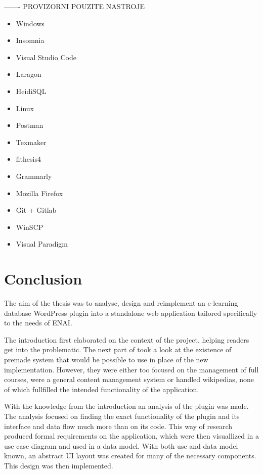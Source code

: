 \documentclass[
  digital,     %
  oneside,     %
  nosansbold,  %
  colorbold, %
  lof,         %
  lot,         %
]{fithesis4}
\begin{document}
\newpage

------- PROVIZORNI POUZITE NASTROJE

\begin{itemize}
	\item Windows
	\item Insomnia
	\item Visual Studio Code
	\item Laragon
	\item HeidiSQL
	\item Linux
	\item Postman
	\item Texmaker
	\item fithesis4
	\item Grammarly
	\item Mozilla Firefox
	\item Git + Gitlab
	\item WinSCP
	\item Visual Paradigm
\end{itemize}

\newpage

\chapter{Conclusion}

The aim of the thesis was to analyse, design and reimplement an e-learning database WordPress plugin into a standalone web application tailored specifically to the needs of ENAI.

The introduction first elaborated on the context of the project, helping readers get into the problematic.  The next part of took a look at the existence of premade system that would be possible to use in place of the new implementation. However, they were either too focused on the management of full courses, were a general content management system or handled wikipedias, none of which fullfilled the intended functionality of the application.

With the knowledge from the introduction an analysis of the plugin was made. The analysis focused on finding the exact functionality of the plugin and its interface and data flow much more than on its code. This way of research produced formal requirements on the application, which were then visuallized in a use case diagram and used in a data model. With both use and data model known, an abstract UI layout was created for many of the necessary components. This design was then implemented.
\end{document}
